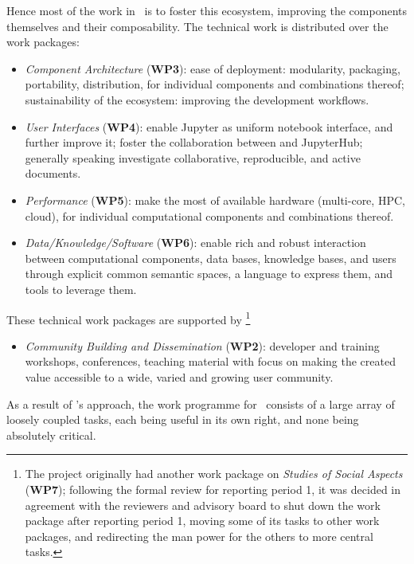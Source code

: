 Hence most of the work in \ODK\ is to foster this ecosystem, improving
the components themselves and their composability. The technical work is
distributed over the work packages:
\begin{itemize}
\item \emph{Component Architecture} (\textbf{WP3}): ease of
  deployment: modularity, packaging, portability, distribution, for
  individual components and combinations thereof; sustainability of
  the ecosystem: improving the development workflows.
\item \emph{User Interfaces} (\textbf{WP4}): enable Jupyter as uniform notebook
  interface, and further improve it; foster the collaboration between
  \cocalc and JupyterHub; generally speaking investigate
  collaborative, reproducible, and active documents.
\item \emph{Performance} (\textbf{WP5}): make the most of available hardware
  (multi-core, HPC, cloud), for individual computational components and
  combinations thereof.
\item \emph{Data/Knowledge/Software} (\textbf{WP6}): enable rich and robust
  interaction between computational components, data bases, knowledge
  bases, and users through explicit common semantic spaces, a language to
  express them, and tools to leverage them.
\end{itemize}
These technical work packages are supported by%
\footnote{The project originally had another work package on
  \emph{Studies of Social Aspects} (\textbf{WP7}); following the
  formal review for reporting period 1, it was decided in agreement
  with the reviewers and advisory board to shut down the work package
  after reporting period 1, moving some of its tasks to other work
  packages, and redirecting the man power for the others to more
  central tasks.}
\begin{itemize}
\item \emph{Community Building and Dissemination} (\textbf{WP2}): developer and
  training workshops, conferences, teaching material with focus on
  making the created value accessible to a wide, varied and growing user community.
\end{itemize}

As a result of \ODK's approach, the work programme for \ODK\ consists
of a large array of loosely coupled tasks, each being useful in its
own right, and none being absolutely critical.

